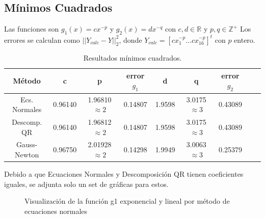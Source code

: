 \documentclass{endm}
\begin{document}
\subsection{Mínimos Cuadrados}
Las funciones son $g_1(x)=c x^{-p} $ y $g_2(x)=d x^{-q} $ con $c,d \in \mathbb{R}$ y $p,q \in \mathbb{Z^+}$
Los errores se calculan como $||Y_{calc} - Y ||^2_2$, donde $Y_{calc} = [cx_1^{-p} \dots cx_{16}^{-p}]^t$ con $p$ entero.
\begin{table}[h!]
    \begin{center}
      \caption{Resultados mínimos cuadrados.}
      \label{tab:table1}
      \begin{tabular}{c|c|c|c|c|c|c|c|c} %
        \textbf{Método} & \textbf{c} & \textbf{p} & \textbf{error $g_1$} & \textbf{d} & \textbf{q} & \textbf{error $g_2$} \\
        \hline
        Ecs. Normales & 0.96140 & 1.96810 $\approx 2$ & 0.14807 & 1.9598 & 3.0175 $\approx 3$ & 0.43089 \\
        Descomp. QR   & 0.96140 & 1.96812 $\approx 2$ & 0.14807 & 1.9598 & 3.0175 $\approx 3$ & 0.43089 \\
        Gauss-Newton  & 0.96750 & 2.01928 $\approx 2$ & 0.14298 & 1.9949 & 3.0063 $\approx 3$ & 0.25379 \\
      \end{tabular}
    \end{center}
  \end{table}

Debido a que Ecuaciones Normales y Descomposición QR tienen coeficientes iguales, se adjunta solo un set de gráficas para estos.
\begin{figure}%
    \centering
    \qquad
    \caption{Visualización de la función g1 exponencial y lineal por método de ecuaciones normales}%
    \label{fig:example}%
\end{figure}
\end{document}
